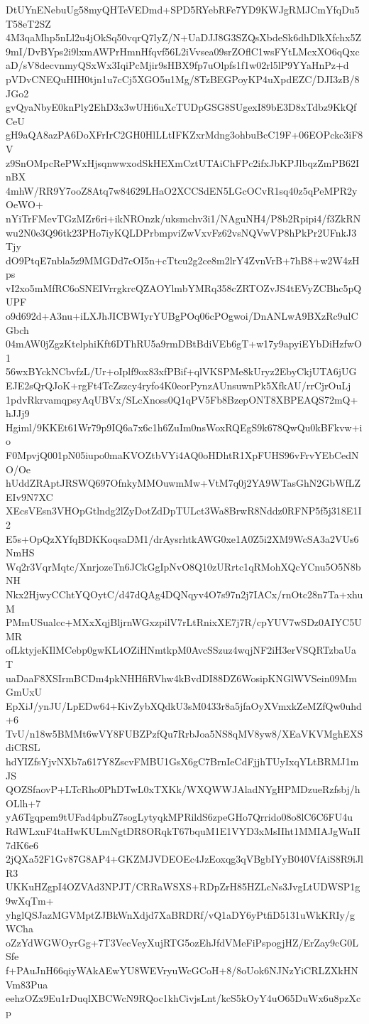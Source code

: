 DtUYnENebuUg58myQHTeVEDmd+SPD5RYebRFe7YD9KWJgRMJCmYfqDu5T58eT2SZ
4M3qaMhp5nLl2u4jOkSq50vqrQ7lyZ/N+UaDJJ8G3SZQsXbdeSk6dhDlkXfchx5Z
9mI/DvBYps2i9lxmAWPrHmnHfqvf56L2iVvsea09srZOflC1wsFYtLMcxXO6qQxc
aD/sV8decvnmyQSxWx3IqiPcMjir9sHBX9fp7uOlpfs1f1w02rl5lP9YYaHnPz+d
pVDvCNEQuHIH0tjn1u7cCj5XGO5u1Mg/8TzBEGPoyKP4uXpdEZC/DJI3zB/8JGo2
gvQyaNbyE0knPly2EhD3x3wUHi6uXcTUDpGSG8SUgexI89bE3D8xTdbz9KkQfCeU
gH9aQA8azPA6DoXFrIrC2GH0HlLLtIFKZxrMdng3ohbuBcC19F+06EOPckc3iF8V
z9SnOMpcRePWxHjsqnwwxodSkHEXmCztUTAiChFPc2ifxJbKPJlbqzZmPB62InBX
4mhW/RR9Y7ooZ8Atq7w84629LHaO2XCCSdEN5LGcOCvR1sq40z5qPeMPR2yOeWO+
nYiTrFMevTGzMZr6ri+ikNROnzk/uksmchv3i1/NAguNH4/P8b2Rpipi4/f3ZkRN
wu2N0e3Q96tk23PHo7iyKQLDPrbmpviZwVxvFz62vsNQVwVP8hPkPr2UFnkJ3Tjy
dO9PtqE7nbla5z9MMGDd7cOI5n+cTtcu2g2ce8m2lrY4ZvnVrB+7hB8+w2W4zHps
vI2xo5mMfRC6oSNEIVrrgkrcQZAOYlmbYMRq358cZRTOZvJS4tEVyZCBhc5pQUPF
o9d692d+A3nu+iLXJhJICBWIyrYUBgPOq06cPOgwoi/DnANLwA9BXzRc9ulCGbch
04mAW0jZgzKtelphiKft6DThRU5a9rmDBtBdiVEb6gT+w17y9apyiEYbDiHzfwO1
56wxBYckNCbvfzL/Ur+oIplf9ox83xfPBif+qlVKSPMe8kUryz2EbyCkjUTA6jUG
EJE2sQrQJoK+rgFt4TcZszcy4ryfo4K0eorPynzAUnsuwnPk5XfkAU/rrCjrOuLj
1pdvRkrvamqpsyAqUBVx/SLcXnoss0Q1qPV5Fb8BzepONT8XBPEAQS72mQ+hJJj9
Hgiml/9KKEt61Wr79p9IQ6a7x6c1h6ZuIm0nsWoxRQEgS9k678QwQu0kBFkvw+io
F0MpvjQ001pN05iupo0maKVOZtbVYi4AQ0oHDhtR1XpFUHS96vFrvYEbCedNO/Oe
hUddZRAptJRSWQ697OfnkyMMOuwmMw+VtM7q0j2YA9WTasGhN2GbWfLZEIv9N7XC
XEcsVEsn3VHOpGtlndg2lZyDotZdDpTULct3Wa8BrwR8Nddz0RFNP5f5j318E1I2
E5s+OpQzXYfqBDKKoqsaDM1/drAysrhtkAWG0xe1A0Z5i2XM9WcSA3a2VUs6NmHS
Wq2r3VqrMqtc/XnrjozeTn6JCkGgIpNvO8Q10zURrtc1qRMohXQcYCnu5O5N8bNH
Nkx2HjwyCChtYQOytC/d47dQAg4DQNqyv4O7s97n2j7IACx/rnOtc28n7Ta+xhuM
PMmUSualcc+MXxXqjBljrnWGxzpilV7rLtRnixXE7j7R/cpYUV7wSDz0AIYC5UMR
ofLktyjeKIlMCebp0gwKL4OZiHNmtkpM0AvcSSzuz4wqjNF2iH3erVSQRTzbaUaT
uaDaaF8XSIrmBCDm4pkNHHfiRVhw4kBvdDI88DZ6WosipKNGlWVSein09MmGmUxU
EpXiJ/ynJU/LpEDw64+KivZybXQdkU3sM0433r8a5jfaOyXVmxkZeMZfQw0uhd+6
TvU/n18w5BMMt6wVY8FUBZPzfQu7RrbJoa5NS8qMV8yw8/XEaVKVMghEXSdiCRSL
hdYIZfsYjvNXb7a617Y8ZscvFMBU1GsX6gC7BrnIeCdFjjhTUyIxqYLtBRMJ1mJS
QOZSfaovP+LTcRho0PhDTwL0xTXKk/WXQWWJAladNYgHPMDzueRzfsbj/hOLlh+7
yA6Tgqpem9tUFad4pbuZ7sogLytyqkMPRildS6zpeGHo7Qrrido08o8lC6C6FU4u
RdWLxuF4taHwKULmNgtDR8ORqkT67bquM1E1VYD3xMsIIht1MMIAJgWnII7dK6e6
2jQXa52F1Gv87G8AP4+GKZMJVDEOEc4JzEoxqg3qVBgbIYyB040VfAiS8R9iJlR3
UKKuHZgpI4OZVAd3NPJT/CRRaWSXS+RDpZrH85HZLcNs3JvgLtUDWSP1g9wXqTm+
yhglQSJazMGVMptZJBkWnXdjd7XaBRDRf/vQ1aDY6yPtfiD5131uWkKRIy/gWCha
oZzYdWGWOyrGg+7T3VecVeyXujRTG5ozEhJfdVMeFiPspogjHZ/ErZay9cG0LSfe
f+PAuJnH66qiyWAkAEwYU8WEVryuWcGCoH+8/8oUok6NJNzYiCRLZXkHNVm83Pua
eehzOZx9Eu1rDuqlXBCWcN9RQoc1khCivjsLnt/kcS5kOyY4uO65DuWx6u8pzXcp
